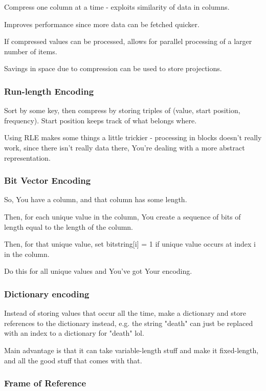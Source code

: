 \documentclass{article}
\begin{document}
			Compress one column at a time - exploits similarity of data in columns.
			
			Improves performance since more data can be fetched quicker.
			
			If compressed values can be processed, allows for parallel processing of a larger number of items.
			
			Savings in space due to compression can be used to store projections.
			
		\subsubsection{Run-length Encoding}
		
			Sort by some key, then compress by storing triples of (value, start position, frequency). Start position keeps track of what belongs where.
			
			Using RLE makes some things a little trickier - processing in blocks doesn't really work, since there isn't really data there, You're dealing with a more abstract representation.
			
		\subsubsection{Bit Vector Encoding}
		
			So, You have a column, and that column has some length.
			
			Then, for each unique value in the column, You create a sequence of bits of length equal to the length of the column.
			
			Then, for that unique value, set bitstring[i] = 1 if unique value occurs at index i in the column.
			
			Do this for all unique values and You've got Your encoding.
			
		\subsubsection{Dictionary encoding}
			
			Instead of storing values that occur all the time, make a dictionary and store references to the dictionary instead, e.g. the string "death" can just be replaced with an index to a dictionary for "death" lol.
			
			Main advantage is that it can take variable-length stuff and make it fixed-length, and all the good stuff that comes with that.
			
		\subsubsection{Frame of Reference}
			
\end{document}
